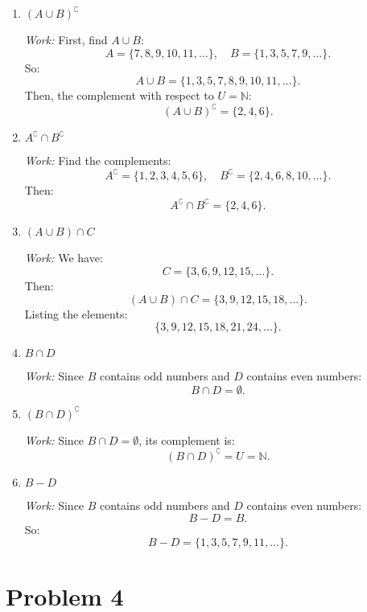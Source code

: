 \documentclass[12pt]{article}
\theoremstyle{definition}
\begin{document}
\begin{enumerate}[label=(\alph*)]
    \item $(A \cup B)^\complement$

    \textit{Work:} First, find $A \cup B$:
    \[
    A = \{7, 8, 9, 10, 11, \ldots\}, \quad B = \{1, 3, 5, 7, 9, \ldots\}.
    \]
    So:
    \[
    A \cup B = \{1, 3, 5, 7, 8, 9, 10, 11, \ldots\}.
    \]
    Then, the complement with respect to $U = \mathbb{N}$:
    \[
    (A \cup B)^\complement = \{2, 4, 6\}.
    \]

    \item $A^\complement \cap B^\complement$

    \textit{Work:} Find the complements:
    \[
    A^\complement = \{1, 2, 3, 4, 5, 6\}, \quad B^\complement = \{2, 4, 6, 8, 10, \ldots\}.
    \]
    Then:
    \[
    A^\complement \cap B^\complement = \{2, 4, 6\}.
    \]

    \item $(A \cup B) \cap C$

    \textit{Work:} We have:
    \[
    C = \{3, 6, 9, 12, 15, \ldots\}.
    \]
    Then:
    \[
    (A \cup B) \cap C = \{3, 9, 12, 15, 18, \ldots\}.
    \]
    Listing the elements:
    \[
    \{3, 9, 12, 15, 18, 21, 24, \ldots\}.
    \]

    \item $B \cap D$

    \textit{Work:} Since $B$ contains odd numbers and $D$ contains even numbers:
    \[
    B \cap D = \emptyset.
    \]

    \item $(B \cap D)^\complement$

    \textit{Work:} Since $B \cap D = \emptyset$, its complement is:
    \[
    (B \cap D)^\complement = U = \mathbb{N}.
    \]

    \item $B - D$

    \textit{Work:} Since $B$ contains odd numbers and $D$ contains even numbers:
    \[
    B - D = B.
    \]
    So:
    \[
    B - D = \{1, 3, 5, 7, 9, 11, \ldots\}.
    \]

\end{enumerate}

\newpage

\section*{Problem 4}
\end{document}
